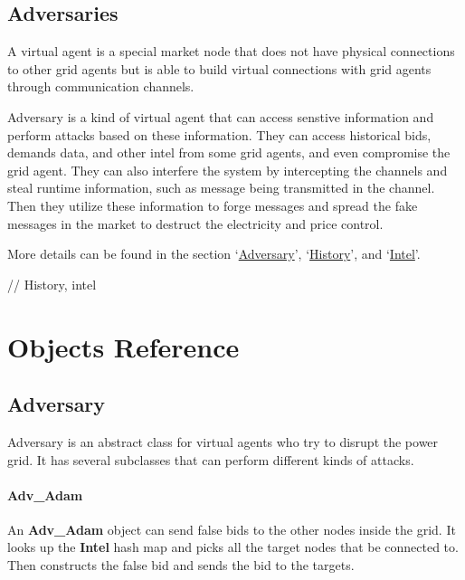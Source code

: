 \documentclass[12pt]{article}
\begin{document}
\subsection{Adversaries} \mbox{}

A virtual agent is a special market node that does not have physical connections to other grid agents 
but is able to build virtual connections with grid agents through communication channels. 

Adversary is a kind of virtual agent that can access senstive information and 
perform attacks based on these information. 
They can access historical bids, demands data, and other intel from some grid agents, 
and even compromise the grid agent. 
They can also interfere the system by intercepting the channels and steal runtime information, 
such as message being transmitted in the channel. 
Then they utilize these information to forge messages and spread the fake messages 
in the market to destruct the electricity and price control. 

More details can be found in the section `\hyperref[subsec:objects_adversary]{Adversary}', 
`\hyperref[subsec:objects_history]{History}', and `\hyperref[subsec:objects_intel]{Intel}'. 

// History, intel

\section{Objects Reference}
\label{sec:objects}

\subsection{Adversary} \mbox{}
\label{subsec:objects_adversary}

Adversary is an abstract class for virtual agents who try to disrupt the
power grid. It has several subclasses that can perform different
kinds of attacks.

\paragraph{Adv\_Adam} \mbox{}

An \textbf{Adv\_Adam} object can send false bids to the other nodes inside the grid. 
It looks up the \textbf{Intel} hash map and picks all the target nodes that be 
connected to. Then constructs the false bid and sends the bid to the targets.
\end{document}
